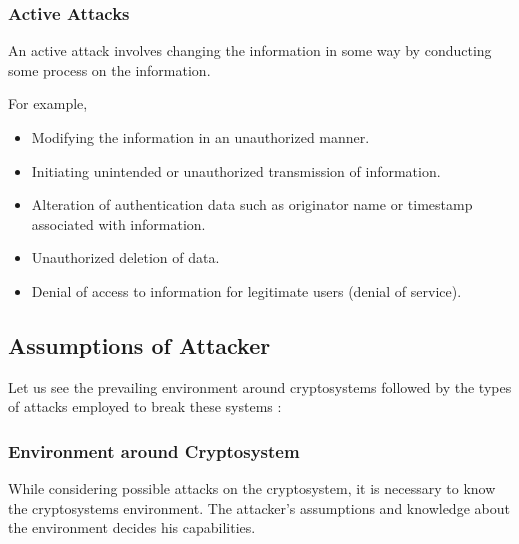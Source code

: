 \documentclass[british]{article}
\begin{document}
\subsubsection{Active Attacks}

An active attack involves changing the information in some way by
conducting some process on the information.

For example,
\begin{itemize}
	\item Modifying the information in an unauthorized manner.
	\item Initiating unintended or unauthorized transmission of information.
	\item Alteration of authentication data such as originator name or timestamp
	      associated with information.
	\item Unauthorized deletion of data.
	\item Denial of access to information for legitimate users (denial of service).
\end{itemize}

\subsection{Assumptions of Attacker}

Let us see the prevailing environment around cryptosystems followed
by the types of attacks employed to break these systems :

\subsubsection{Environment around Cryptosystem}

While considering possible attacks on the cryptosystem, it is necessary
to know the cryptosystems environment. The attacker's assumptions
and knowledge about the environment decides his capabilities.
\end{document}
